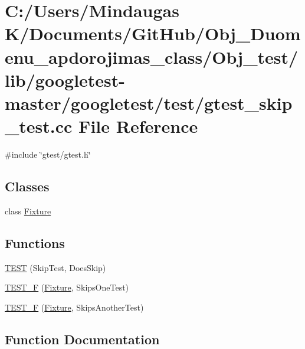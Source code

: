 \hypertarget{_obj__test_2lib_2googletest-master_2googletest_2test_2gtest__skip__test_8cc}{}\section{C\+:/\+Users/\+Mindaugas K/\+Documents/\+Git\+Hub/\+Obj\+\_\+\+Duomenu\+\_\+apdorojimas\+\_\+class/\+Obj\+\_\+test/lib/googletest-\/master/googletest/test/gtest\+\_\+skip\+\_\+test.cc File Reference}
\label{_obj__test_2lib_2googletest-master_2googletest_2test_2gtest__skip__test_8cc}
{\ttfamily \#include \char`\"{}gtest/gtest.\+h\char`\"{}}\newline
\subsection*{Classes}
\begin{DoxyCompactItemize}
\item 
class \mbox{\hyperlink{class_fixture}{Fixture}}
\end{DoxyCompactItemize}
\subsection*{Functions}
\begin{DoxyCompactItemize}
\item 
\mbox{\hyperlink{_obj__test_2lib_2googletest-master_2googletest_2test_2gtest__skip__test_8cc_aa7f480df6c65426af4674b1cd81749b0}{T\+E\+ST}} (Skip\+Test, Does\+Skip)
\item 
\mbox{\hyperlink{_obj__test_2lib_2googletest-master_2googletest_2test_2gtest__skip__test_8cc_a562ce30ed6cc2d7bd26442c8af3ef46a}{T\+E\+S\+T\+\_\+F}} (\mbox{\hyperlink{class_fixture}{Fixture}}, Skips\+One\+Test)
\item 
\mbox{\hyperlink{_obj__test_2lib_2googletest-master_2googletest_2test_2gtest__skip__test_8cc_acc5e9e90a58e7d37f3b6d5560e9db993}{T\+E\+S\+T\+\_\+F}} (\mbox{\hyperlink{class_fixture}{Fixture}}, Skips\+Another\+Test)
\end{DoxyCompactItemize}


\subsection{Function Documentation}
\mbox{\label{_obj__test_2lib_2googletest-master_2googletest_2test_2gtest__skip__test_8cc_aa7f480df6c65426af4674b1cd81749b0}} 
